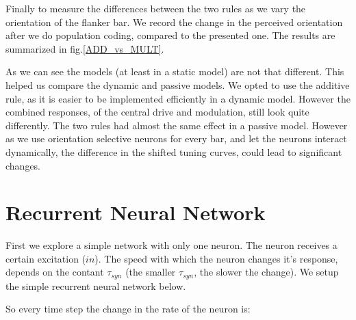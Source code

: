 
Finally to measure the differences between the two rules as we vary the orientation of the flanker bar. We record the change in the perceived orientation after we do population coding, compared to the presented one. The results are summarized in fig.\ref{ADD_vs_MULT}.


As we can see the models (at least in a static model) are not that different. This helped us compare the dynamic and passive models. We opted to use the additive rule, as it is easier to be implemented efficiently in a dynamic model. However the combined responses, of the central drive and modulation, still look quite differently. The two rules had almost the same effect in a passive model. However as we use orientation selective neurons for every bar, and let the neurons interact dynamically, the difference in the shifted tuning curves, could lead to significant changes.

\section{Recurrent Neural Network} \label{rnnsection}

First we explore a simple network with only one neuron. The neuron receives a certain excitation ($in$). The speed with which the neuron changes it's response, depends on the contant $\tau_{syn}$ (the smaller $\tau_{syn}$, the slower the change). We setup the simple recurrent neural network below.


So every time step the change in the rate of the neuron is:



